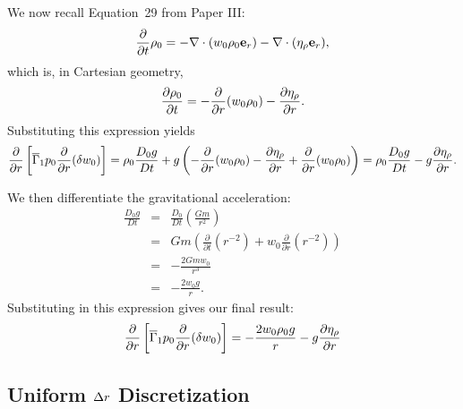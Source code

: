 We now recall Equation~29 from Paper III:
\[ \frac{\partial}{\partial t}{\rho_0} = - \nabla \cdot ({w_0 \rho_0 \mathbf{e}_r})
                  - \nabla \cdot ({\eta_{\rho} \mathbf{e}_r}), \]
which is, in Cartesian geometry,
\begin{equation}
\frac{\partial \rho_0}{\partial t} = - \frac{\partial}{\partial r}{({w_0 \rho_0})}
                  - \frac{\partial \eta_{\rho}}{\partial r}.
\end{equation}
Substituting this expression yields
\begin{equation}
\frac{\partial}{\partial r}{} \left[ \overline{\Gamma}_1 p_0 \frac{\partial}{\partial r}{({\delta w_0})} \right]
   = \rho_0 \frac{D_0 g}{D t} + g \left ({- \frac{\partial}{\partial r}{({w_0 \rho_0})} - \frac{\partial \eta_{\rho}}{\partial r} + \frac{\partial}{\partial r}{({w_0 \rho_0})}} \right)
   = \rho_0 \frac{D_0 g}{D t} - g \frac{\partial \eta_{\rho}}{\partial r}.
\end{equation}

We then differentiate the gravitational acceleration:
\begin{eqnarray}
\frac{D_0 g}{D t}
   & = & \frac{D_0}{Dt} \left ({\frac{G m}{r^2}} \right ) \nonumber \\
   & = & G m \left ({\frac{\partial}{\partial t}{({r^{-2}})} + w_0 \frac{\partial}{\partial r}{({r^{-2}})}} \right ) \nonumber \\
   & = & - \frac{2 G m w_0}{r^3} \nonumber \\
   & = & - \frac{2 w_0 g}{r}.
\end{eqnarray}
Substituting in this expression gives our final result:
\begin{equation}
\frac{\partial}{\partial r}{} \left[ \overline{\Gamma}_1 p_0 \frac{\partial}{\partial r}{({\delta w_0})} \right]
   = - \frac{2 w_0 \rho_0 g}{r} - g \frac{\partial \eta_{\rho}}{\partial r}
\end{equation}

\subsection{Uniform $\Delta r$ Discretization}

